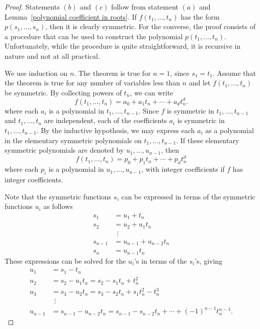 \begin{proof}
Statements $(b)$ and $(c)$ follow from statement $(a)$ and Lemma~\ref{polynomial coefficient in roots}. If $f(t_1,\dots,t_n)$ has the form $p(s_1,\dots,s_n)$, then it is clearly symmetric. For the converse, the proof consists of a procedure that can be used to construct the polynomial $p(t_1,\dots,t_n)$. Unfortunately, while the procedure is quite straightforward, it is recursive in nature and not at all practical.\par
We use induction on $n$. The theorem is true for $n=1$, since $s_1=t_1$. Assume that the theorem is true for any number of variables less than $n$ and let $f(t_1,\dots,t_n)$ be symmetric. By collecting powers of $t_n$, we can write
\[f(t_1,\dots,t_n)=a_0+a_1t_n+\cdots+a_dt_n^d.\]
where each $a_i$ is a polynomial in $t_1,\dots,t_{n-1}$. Since $f$ is symmetric in $t_1,\dots,t_{n-1}$ and $t_1,\dots,t_{n}$ are independent, each of the coefficients $a_i$ is symmetric in $t_1,\dots,t_{n-1}$. By the inductive hypothesis, we may express each $a_i$ as a polynomial in the elementary symmetric polynomials on $t_1,\dots,t_{n-1}$. If these elementary symmetric polynomials are denoted by $u_1,\dots,u_{n-1}$, then
\[f(t_1,\dots,t_n)=p_0+p_1t_n+\cdots+p_dt_n^d\]
where each $p_i$ is a polynomial in $u_1,\dots,u_{n-1}$, with integer coefficients if $f$ has integer coefficients.\par
Note that the symmetric functions $s_i$ can be expressed in terms of the symmetric functions $u_i$ as follows
\begin{equation}\label{Newton's Theorem-1}
\begin{aligned}
s_1&=u_1+t_n\\
s_2&=u_2+u_1t_n\\
&\ \ \vdots\\
s_{n-1}&=u_{n-1}+u_{n-2}t_n\\
s_n&=u_{n-1}t_n
\end{aligned}
\end{equation}
These expressions can be solved for the $u_i$'s in terms of the $s_i$'s, giving
\begin{equation}\label{Newton's Theorem-2}
\begin{aligned}
u_1&=s_1-t_n\\
u_2&=s_2-u_1t_n=s_2-s_1t_n+t_n^2\\
u_3&=s_3-u_2t_n=s_3-s_2t_n+s_1t_n^2-t_n^3\\
&\ \ \vdots\\
u_{n-1}&=s_{n-1}-u_{n-2}t_n=s_{n-1}-s_{n-2}t_n+\cdots+(-1)^{n-1}t_n^{n-1}.

\end{aligned}
\end{equation}
\end{proof}
